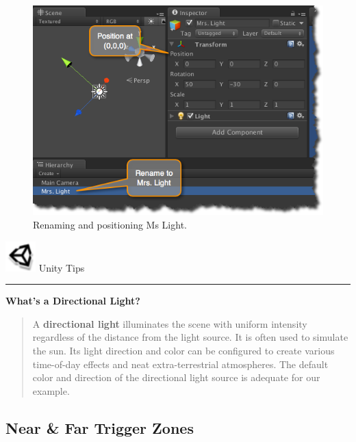 \begin{figure}[htbp]
\centering
\includegraphics[keepaspectratio,width=\textwidth,height=0.75\textheight]{config-mrs-light.png}
\caption{Renaming and positioning Ms Light.}
\label{config-mrs-light.png}
\end{figure}
\begin{tipbox}

\includegraphics[width=33pt,height=33pt]{UnityLogo_32x32.png} {\Large \color{black} Unity Tips }

\begin{center}\rule{\textwidth}{0.4pt}\end{center}

\textbf{What's a Directional Light?}

\begin{quote}

A \textbf{directional light} illuminates the scene with uniform intensity regardless of the distance from the light source. It is often used to simulate the sun. Its light direction and color can be configured to create various time-of-day effects and neat extra-terrestrial atmospheres. The default color and direction of the directional light source is adequate for our example.
\end{quote}

\end{tipbox}



\subsection{Near \& Far Trigger Zones}
\label{nearfartriggerzones}

